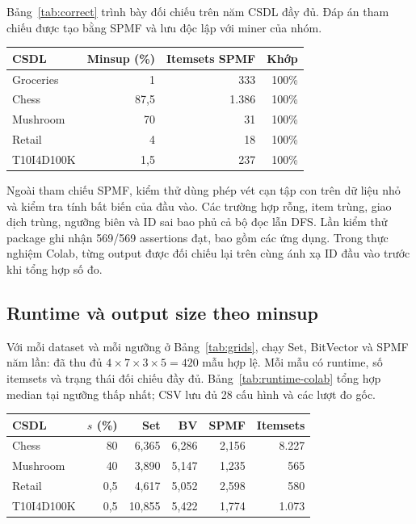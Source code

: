 Bảng~\ref{tab:correct} trình bày đối chiếu trên năm CSDL đầy đủ.
Đáp án tham chiếu được tạo bằng SPMF và lưu độc lập với miner của nhóm.

\begin{reporttable}
\caption{Correctness đã kiểm chứng: cả hai backend khớp toàn bộ itemset/support.}
\label{tab:correct}
\footnotesize
\begin{tabular}{lrrr}\toprule
CSDL & Minsup (\%) & Itemsets SPMF & Khớp\\\midrule
Groceries & 1 & 333 & 100\%\\
Chess & 87,5 & 1.386 & 100\%\\
Mushroom & 70 & 31 & 100\%\\
Retail & 4 & 18 & 100\%\\
T10I4D100K & 1,5 & 237 & 100\%\\\bottomrule
\end{tabular}
\end{reporttable}

Ngoài tham chiếu SPMF, kiểm thử dùng phép vét cạn tập con trên dữ liệu
nhỏ và kiểm tra tính bất biến của đầu vào. Các trường hợp rỗng, item
trùng, giao dịch trùng, ngưỡng biên và ID sai bao phủ cả bộ đọc lẫn DFS.
Lần kiểm thử package ghi nhận 569/569 assertions đạt, bao gồm các ứng
dụng. Trong thực nghiệm Colab, từng output được đối chiếu lại trên
cùng ánh xạ ID đầu vào trước khi tổng hợp số đo.

\subsection{Runtime và output size theo minsup}
Với mỗi dataset và mỗi ngưỡng ở Bảng~\ref{tab:grids}, chạy Set, BitVector
và SPMF năm lần: đã thu đủ $4\times7\times3\times5=420$ mẫu hợp lệ.
Mỗi mẫu có runtime, số itemsets và trạng thái đối chiếu đầy đủ.
Bảng~\ref{tab:runtime-colab} tổng hợp median tại ngưỡng thấp nhất;
CSV lưu đủ 28 cấu hình và các lượt đo gốc.

\begin{reporttable}
\caption{Runtime toàn tiến trình tại ngưỡng thấp nhất (s); median của năm lượt Colab. BV là BitVector.}
\label{tab:runtime-colab}
\footnotesize
\begin{tabular}{lrrrrr}\toprule
CSDL & $s$ (\%) & Set & BV & SPMF & Itemsets\\\midrule
Chess & 80 & 6,365 & 6,286 & 2,156 & 8.227\\
Mushroom & 40 & 3,890 & 5,147 & 1,235 & 565\\
Retail & 0,5 & 4,617 & 5,052 & 2,598 & 580\\
T10I4D100K & 0,5 & 10,855 & 5,422 & 1,774 & 1.073\\\bottomrule
\end{tabular}
\end{reporttable}

